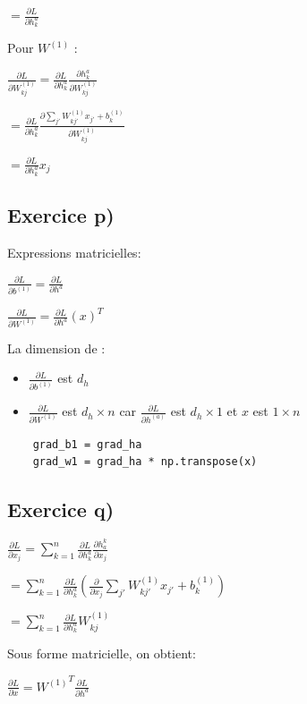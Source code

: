 \documentclass[a4paper,10pt]{article}
\begin{document}
$ = \frac{\partial L}{\partial h^{a}_{k}}$

Pour $W^{(1)}$ :

$\frac{\partial L}{\partial W^{(1)}_{kj}} = \frac{\partial L}{\partial h^{a}_{k}} \frac{\partial h^{a}_{k}}{\partial W^{(1)}_{kj}} $

$ = \frac{\partial L}{\partial h^{a}_{k}} \frac{\partial \sum_{j'} W^{(1)}_{kj'} x_{j'} + b^{(1)}_{k}}{\partial W^{(1)}_{kj}}$

$ = \frac{\partial L}{\partial h^{a}_{k}} x_{j} $


\subsection{Exercice p)}

Expressions matricielles:

$\frac{\partial L}{\partial b^{(1)}} = \frac{\partial L}{\partial h^a}$

$\frac{\partial L}{\partial W^{(1)}} = \frac{\partial L}{\partial h^a}(x)^T$

La dimension de :
\begin{itemize}
	\item $\frac{\partial L}{\partial b^{(1)}}$ est $d_{h}$
	\item $\frac{\partial L}{\partial W^{(1)}}$ est $d_{h} \times n$ car  $\frac{\partial L}{\partial h^{(a)}}$ est $d_{h} \times 1$ et $ x $ est $1 \times n$
\end{itemize}

\begin{verbatim}
	grad_b1 = grad_ha
	grad_w1 = grad_ha * np.transpose(x)
\end{verbatim}


\subsection{Exercice q)}

$\frac{\partial L}{\partial x_j} = \sum_{k=1}^{n} \frac{\partial L}{\partial h_k^a} \frac{\partial h_a^k}{\partial x_j}$

$ = \sum_{k=1}^{n} \frac{\partial L}{\partial h_k^a} (\frac{\partial }{\partial x_j} \sum_{j'} W^{(1)}_{kj'} x_{j'} + b^{(1)}_k)$

$ = \sum_{k=1}^{n} \frac{\partial L}{\partial h_k^a} W^{(1)}_{kj}$

Sous forme matricielle, on obtient:

$\frac{\partial L}{\partial x} = {W^{(1)}}^T \frac{\partial L}{\partial h^a}$
\end{document}
